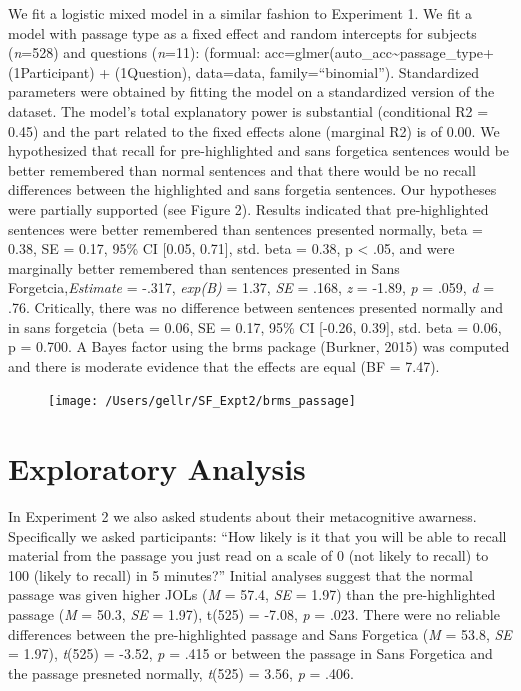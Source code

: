 \documentclass[pdf]{apa6}
\begin{document}
We fit a logistic mixed model in a similar fashion to Experiment 1. We fit a model with passage type as a fixed effect and random intercepts for subjects (\emph{n}=528) and questions (\emph{n}=11): (formual: acc=glmer(auto\_acc\textasciitilde{}passage\_type+(1\textbar{}Participant) + (1\textbar{}Question), data=data, family=\enquote{binomial}). Standardized parameters were obtained by fitting the model on a standardized version of the dataset. The model's total explanatory power is substantial (conditional R2 = 0.45) and the part related to the fixed effects alone (marginal R2) is of 0.00. We hypothesized that recall for pre-highlighted and sans forgetica sentences would be better remembered than normal sentences and that there would be no recall differences between the highlighted and sans forgetia sentences. Our hypotheses were partially supported (see Figure 2). Results indicated that pre-highlighted sentences were better remembered than sentences presented normally, beta = 0.38, SE = 0.17, 95\% CI {[}0.05, 0.71{]}, std. beta = 0.38, p \textless{} .05, and were marginally better remembered than sentences presented in Sans Forgetcia,\emph{Estimate} = -.317, \emph{exp(B)} = 1.37, \emph{SE} = .168, \emph{z} = -1.89, \emph{p} = .059, \emph{d} = .76. Critically, there was no difference between sentences presented normally and in sans forgetcia (beta = 0.06, SE = 0.17, 95\% CI {[}-0.26, 0.39{]}, std. beta = 0.06, p = 0.700. A Bayes factor using the brms package (Burkner, 2015) was computed and there is moderate evidence that the effects are equal (BF = 7.47).

\begin{figure}
\texttt{[image: /Users/gellr/SF\_Expt2/brms\_passage]} \caption{ }\label{fig:unnamed-chunk-4}
\end{figure}

\hypertarget{exploratory-analysis}{%
\section{Exploratory Analysis}\label{exploratory-analysis}}

In Experiment 2 we also asked students about their metacognitive awarness. Specifically we asked participants: \enquote{How likely is it that you will be able to recall material from the passage you just read on a scale of 0 (not likely to recall) to 100 (likely to recall) in 5 minutes?} Initial analyses suggest that the normal passage was given higher JOLs (\emph{M} = 57.4, \emph{SE} = 1.97) than the pre-highlighted passage (\emph{M} = 50.3, \emph{SE} = 1.97), t(525) = -7.08, \emph{p} = .023. There were no reliable differences between the pre-highlighted passage and Sans Forgetica (\emph{M} = 53.8, \emph{SE} = 1.97), \emph{t}(525) = -3.52, \emph{p} = .415 or between the passage in Sans Forgetica and the passage presneted normally, \emph{t}(525) = 3.56, \emph{p} = .406.
\end{document}
